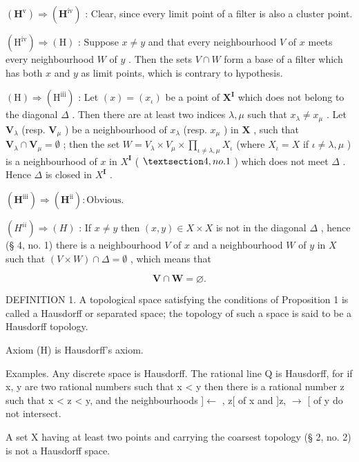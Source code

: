 \((\mathbf{H}^{\mathrm{v}}) \Rightarrow (\mathbf{H}^{\mathrm{iv}})\) : Clear, since every limit point of a filter is also a cluster point.

\((\mathrm{H}^{\mathrm{iv}}) \Longrightarrow (\mathrm{H})\) : Suppose \(x \neq y\) and that every neighbourhood \(V\) of \(x\) meets every neighbourhood \(W\) of \(y\) . Then the sets \(V \cap W\) form a base of a filter which has both \(x\) and \(y\) as limit points, which is contrary to hypothesis.

\((\mathrm{H}) \Longrightarrow (\mathrm{H}^{\mathrm{iii}})\) : Let \((x) = (x_{\iota})\) be a point of \(\mathbf{X}^{\mathbf{I}}\) which does not belong to the diagonal \(\Delta\) . Then there are at least two indices \(\lambda, \mu\) such that \(x_{\lambda} \neq x_{\mu}\) . Let \(\mathbf{V}_{\lambda}\) (resp. \(\mathbf{V}_{\mu}\) ) be a neighbourhood of \(x_{\lambda}\) (resp. \(x_{\mu}\) ) in \(\mathbf{X}\) , such that \(\mathbf{V}_{\lambda} \cap \mathbf{V}_{\mu} = \emptyset\) ; then the set \(W = V_{\lambda} \times V_{\mu} \times \prod_{\iota \neq \lambda, \mu} X_{\iota}\) (where \(X_{\iota} = X\) if \(\iota \neq \lambda, \mu\) ) is a neighbourhood of \(x\) in \(X^{\mathbf{I}}\) ( \(\S 4, no.1\) ) which does not meet \(\Delta\) . Hence \(\Delta\) is closed in \(X^{\mathbf{I}}\) .

\((\mathbf{H}^{\mathrm{iii}}) \Rightarrow (\mathbf{H}^{\mathrm{ii}}): \text{Obvious.}\)

\((H^{ii}) \Longrightarrow (H)\) : If \(x \neq y\) then \((x, y) \in X \times X\) is not in the diagonal \(\Delta\) , hence (§ 4, no. 1) there is a neighbourhood \(V\) of \(x\) and a neighbourhood \(W\) of \(y\) in \(X\) such that \((V \times W) \cap \Delta = \emptyset\) , which means that

\[
\mathbf {V} \cap \mathbf {W} = \varnothing .
\]

DEFINITION 1. A topological space satisfying the conditions of Proposition 1 is called a Hausdorff or separated space; the topology of such a space is said to be a Hausdorff topology.

Axiom (H) is Hausdorff's axiom.

Examples. Any discrete space is Hausdorff. The rational line Q is Hausdorff, for if x, y are two rational numbers such that x \textless{} y then there is a rational number z such that x \textless{} z \textless{} y, and the neighbourhoods {]}\(\leftarrow\) , z{[} of x and {]}z, \(\rightarrow\) {[} of y do not intersect.

A set X having at least two points and carrying the coarsest topology (§ 2, no. 2) is not a Hausdorff space.

